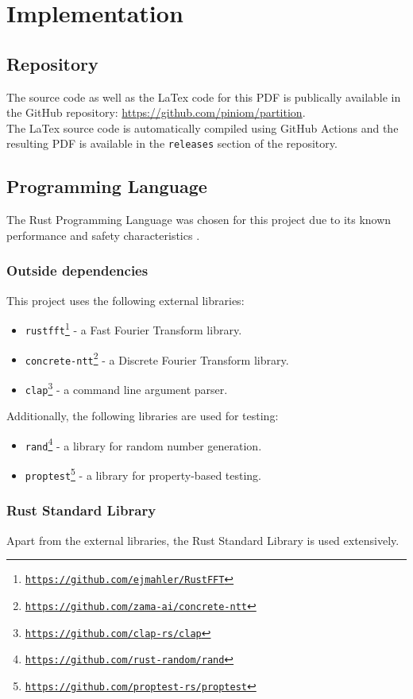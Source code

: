 \section{Implementation}

\subsection{Repository}
The source code as well as the LaTex code for this PDF is publically available in the GitHub repository: \url{https://github.com/piniom/partition}. \\
The LaTex source code is automatically compiled using GitHub Actions and the resulting PDF is available in the \texttt{releases} section of the repository.

\subsection{Programming Language}
The Rust Programming Language was chosen for this project due to its known performance and safety characteristics \cite{rust_cpp}.

\subsubsection{Outside dependencies}
This project uses the following external libraries:
\begin{itemize}
    \item \texttt{rustfft\footnote{\url{https://github.com/ejmahler/RustFFT}}} - a Fast Fourier Transform library.
    \item \texttt{concrete-ntt\footnote{\url{https://github.com/zama-ai/concrete-ntt}}} - a Discrete Fourier Transform library.
    \item \texttt{clap\footnote{\url{https://github.com/clap-rs/clap}}} - a command line argument parser.
\end{itemize}
Additionally, the following libraries are used for testing:
\begin{itemize}
    \item \texttt{rand\footnote{\url{https://github.com/rust-random/rand}}} - a library for random number generation. 
    \item \texttt{proptest\footnote{\url{https://github.com/proptest-rs/proptest}}} - a library for property-based testing.
\end{itemize}

\subsubsection{Rust Standard Library}
Apart from the external libraries, the Rust Standard Library is used extensively.

